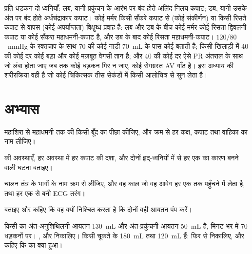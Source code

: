 \begin{example}[किसी हृदय को पढ़ना]\label{ex:b2:heart:reading}
प्रति धड़कन दो ध्वनियाँ: लब, यानी प्रकुंचन के आरंभ पर बंद होते
अलिंद-निलय कपाट; डब, यानी उसके अंत पर बंद होते अर्धचंद्राकार कपाट। कोई मर्मर
किसी सँकरे कपाट से (कोई संकीर्णन) या किसी रिसते कपाट से वापस
(कोई अपर्याप्तता) विक्षुब्ध प्रवाह है: लब और
डब के बीच कोई मर्मर कोई रिसता द्विवलनी कपाट या कोई सँकरा महाधमनी-कपाट है, और डब के बाद
कोई रिसता महाधमनी-कपाट। $120/80$~mmHg के रक्तचाप के साथ 70 की कोई
नाड़ी \qty{70}{mL} के पास कोई  बताती है;
किसी खिलाड़ी में 40 की कोई दर कोई बड़ा  और कोई मज़बूत
वेगसी तान है; और 40 की कोई दर ऐसे PR अंतराल के साथ जो लंबा होता जाए जब तक कोई
धड़कन गिर न जाए, कोई रोगग्रस्त AV गाँठ है। इस अध्याय की शरीरक्रिया वही है
जो कोई चिकित्सक तीस सेकंडों में किसी आलोचित्र से सुन लेता है।
\end{example}

\section{अभ्यास}

\begin{exercise}[$\star$]\label{exo:b2:heart:1}
महाशिरा से महाधमनी तक  की किसी बूँद का पीछा कीजिए, और क्रम से हर
कक्ष, कपाट तथा वाहिका का नाम लीजिए।
\end{exercise}

\begin{exercise}[$\star$]\label{exo:b2:heart:2}
 की अवस्थाएँ, हर अवस्था में हर कपाट की दशा,
और दोनों हृद्-ध्वनियों में से हर एक का कारण बनने वाली घटना
बताइए।
\end{exercise}

\begin{exercise}[$\star$]\label{exo:b2:heart:3}
चालन तंत्र के भागों के नाम क्रम से लीजिए, और वह काल जो वह आवेग
हर एक तक पहुँचने में लेता है, तथा हर एक से बनी ECG तरंग।
\end{exercise}

\begin{exercise}[$\star$]\label{exo:b2:heart:4}
 बताइए और कहिए कि वह क्यों निश्चित करता है कि दोनों
 वही आयतन पंप करें।
\end{exercise}

\begin{exercise}[$\star\star$]\label{exo:b2:heart:5}
किसी  का अंत-अनुशिथिलनी आयतन \qty{130}{mL} और
अंत-प्रकुंचनी आयतन \qty{50}{mL} है, मिनट भर में 70 धड़कनों पर।
,  और  निकालिए। किसी
चूकते  के \qty{180}{mL} तथा \qty{120}{mL} हैं: फिर से निकालिए, और कहिए
कि  का क्या हुआ।
\end{exercise}

